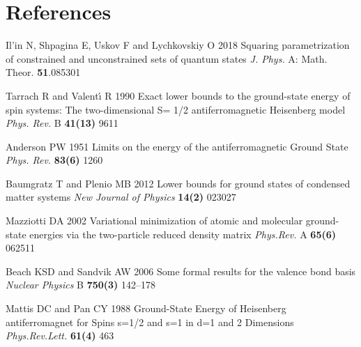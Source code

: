 \documentclass[a4paper]{jpconf}
\renewcommand\[{\begin{equation}}
\renewcommand\]{\end{equation}}
\begin{document}
\section*{References}

\begin{thebibliography}{9}
 Il'in N, Shpagina E, Uskov F and Lychkovskiy O 2018
Squaring parametrization of constrained and unconstrained sets of quantum states
{\it J. Phys.} A: Math. Theor. {\bf 51}.085301

Tarrach R and Valent{\'\i} R 1990 
Exact lower bounds to the ground-state energy of spin systems: The two-dimensional S= 1/2 antiferromagnetic Heisenberg model
{\it Phys. Rev.} B {\bf 41(13)} 9611

 Anderson PW 1951
Limits on the energy of the antiferromagnetic Ground State
{\it Phys. Rev.} {\bf 83(6)} 1260

 Baumgratz T and Plenio MB 2012
Lower bounds for ground states of condensed matter systems
{\it New Journal of Physics} {\bf 14(2)} 023027

 Mazziotti DA 2002
Variational minimization of atomic and molecular ground-state energies via the two-particle reduced density matrix
{\it Phys.Rev.} A {\bf 65(6)} 062511

 Beach KSD and Sandvik AW 2006
Some formal results for the valence bond basis
{\it Nuclear Physics} B {\bf 750(3)} 142–178

 Mattis DC and Pan CY 1988
Ground-State Energy of Heisenberg antiferromagnet for Spins s=1/2 and s=1 in d=1 and 2 Dimensions
{\it Phys.Rev.Lett.} {\bf 61(4)} 463

\end{thebibliography}

\end{document}
